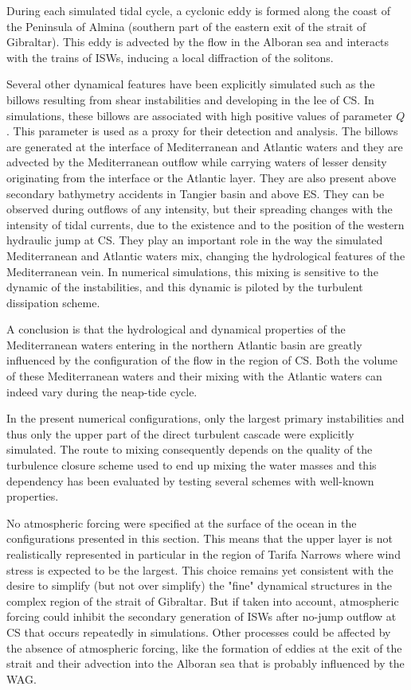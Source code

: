 During each simulated tidal cycle, a cyclonic eddy is formed along the coast of the Peninsula of Almina (southern part of the eastern exit of the strait of Gibraltar). This eddy is advected by the flow in the Alboran sea and interacts with the trains of ISWs, inducing a local diffraction of the solitons. 

Several other dynamical features have been explicitly simulated such as the billows resulting from shear instabilities and developing in the lee of CS. In simulations, these billows are associated with high positive values of parameter $Q$. This parameter is used as a proxy for their detection and analysis. The billows are generated at the interface of Mediterranean and Atlantic waters and they are advected by the Mediterranean outflow while carrying waters of lesser density originating from the interface or the Atlantic layer. They are also present above secondary bathymetry accidents in Tangier basin and above ES. They can be observed during outflows of any intensity, but their spreading changes with the intensity of tidal currents, due to the existence and to the position of the western hydraulic jump at CS. They play an important role in the way the simulated Mediterranean and Atlantic waters mix, changing the hydrological features of the Mediterranean vein. In numerical simulations, this mixing is sensitive to the dynamic of the instabilities, and this dynamic is piloted by the turbulent dissipation scheme.

A conclusion is that the hydrological and dynamical properties of the Mediterranean waters entering in the northern Atlantic basin are greatly influenced by the configuration of the flow in the region of CS. Both the volume of these Mediterranean waters and their mixing with the Atlantic waters can indeed vary during the neap-tide cycle. 

In the present numerical configurations, only the largest primary instabilities and thus only the upper part of the direct turbulent cascade were explicitly simulated. The route to mixing consequently depends on the quality of the turbulence closure scheme used to end up mixing the water masses and this dependency has been evaluated by testing several schemes with well-known properties. 

No atmospheric forcing were specified at the surface of the ocean in the configurations presented in this section. This means that the upper layer is not realistically represented in particular in the region of Tarifa Narrows where wind stress is expected to be the largest. This choice remains yet consistent with the desire to simplify (but not over simplify) the "fine" dynamical structures in the complex region of the strait of Gibraltar. But if taken into account, atmospheric forcing could inhibit the secondary generation of ISWs after no-jump outflow at CS that occurs repeatedly in simulations. Other processes could be affected by the absence of atmospheric forcing, like the formation of eddies at the exit of the strait and their advection into the Alboran sea that is probably influenced by the WAG.

